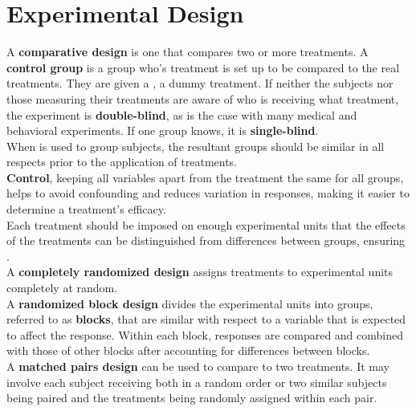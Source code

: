 \documentclass[../AP_Statistics.tex]{subfiles}
\begin{document}
		\section*{Experimental Design}
			A \textbf{comparative design} is one that compares two or more treatments.
			A \textbf{control group} is a group who's treatment is set up to be compared to the real treatments. They are given a , a dummy treatment.
			If neither the subjects nor those measuring their treatments are aware of who is receiving what treatment, the experiment is \textbf{double-blind}, as is the case with many medical and behavioral experiments. If one group knows, it is \textbf{single-blind}. \\
			When  is used to group subjects, the resultant groups should be similar in all respects prior to the application of treatments. \\	
			\textbf{Control}, keeping all variables apart from the treatment the same for all groups, helps to avoid confounding and reduces variation in responses, making it easier to determine a treatment's efficacy.	\\
			Each treatment should be imposed on enough experimental units that the effects of the treatments can be distinguished from  differences between groups, ensuring . \\
			A \textbf{completely randomized design} assigns treatments to experimental units completely at random. \\
			A \textbf{randomized block design} divides the experimental units into groups, referred to as \textbf{blocks}, that are similar with respect to a variable that is expected to affect the response. Within each block, responses are compared and combined with those of other blocks after accounting for differences between blocks. \\
			A \textbf{matched pairs design} can be used to compare to two treatments. It may involve each subject receiving both in a random order or two similar subjects being paired and the treatments being randomly assigned within each pair.
\end{document}
